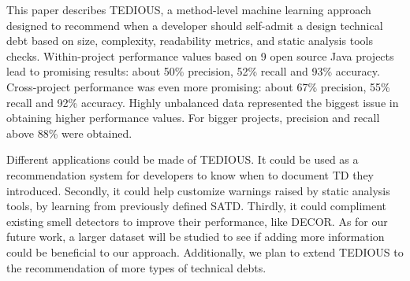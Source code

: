 This paper describes \ac{TEDIOUS}, a method-level machine learning approach designed to recommend when a developer should self-admit a design technical debt based on size, complexity, readability metrics, and static analysis tools checks. Within-project performance values based on 9 open source Java projects lead to promising results: about 50\% precision, 52\% recall and 93\% accuracy. Cross-project performance was even more promising: about 67\% precision, 55\% recall and 92\% accuracy. Highly unbalanced data represented the biggest issue in obtaining higher performance values. For bigger projects, precision and recall above 88\% were obtained. \par

Different applications could be made of \ac{TEDIOUS}. It could be used as a recommendation system for developers to know when to document \ac{TD} they introduced. Secondly, it could help customize warnings raised by static analysis tools, by learning from previously defined \ac{SATD}. Thirdly, it could compliment existing smell detectors to improve their performance, like \ac{DECOR}. As for our future work, a larger dataset will be studied to see if adding more information could be beneficial to our approach. Additionally, we plan to extend \ac{TEDIOUS} to the recommendation of more types of technical debts.





